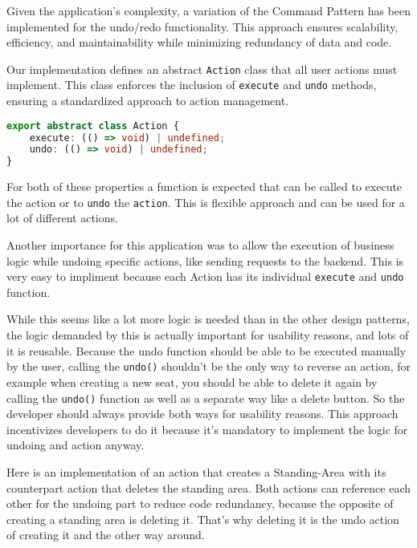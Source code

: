 Given the application's complexity, a variation of the Command Pattern has been implemented for the undo/redo functionality. This approach ensures scalability, efficiency, and maintainability while minimizing redundancy of data and code.

Our implementation defines an abstract \texttt{Action} class that all user actions must implement. This class enforces the inclusion of \texttt{execute} and \texttt{undo} methods, ensuring a standardized approach to action management.

\begin{lstlisting}[language=TypeScript,caption={Action class},label={lst:action-class}]
export abstract class Action {
    execute: (() => void) | undefined;
    undo: (() => void) | undefined;
}
\end{lstlisting}

For both of these properties a function is expected that can be called to execute the action or to \texttt{undo} the \texttt{action}. This is flexible approach and can be used for a lot of different actions. 

Another importance for this application was to allow the execution of business logic while undoing specific actions, like sending requests to the backend. This is very easy to impliment because each Action has its individual \texttt{execute} and \texttt{undo} function.

While this seems like a lot more logic is needed than in the other design patterns, the logic demanded by this is actually important for usability reasons, and lots of it is reusable. Because the undo function should be able to be executed manually by the user, calling the \texttt{undo()} shouldn't be the only way to reverse an action, for example when creating a new seat, you should be able to delete it again by calling the \texttt{undo()} function as well as a separate way like a delete button. So the developer should always provide both ways for usability reasons. This approach incentivizes developers to do it because it's mandatory to implement the logic for undoing and action anyway.

Here is an implementation of an action that creates a Standing-Area with its counterpart action that deletes the standing area. Both actions can reference each other for the undoing part to reduce code redundancy, because the opposite of creating a standing area is deleting it. That's why deleting it is the undo action of creating it and the other way around.

